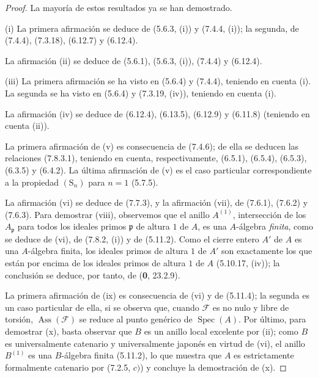 \begin{proof}
La mayoría de estos resultados ya se han demostrado.

(i) La primera afirmación se deduce de (5.6.3, (i)) y (7.4.4, (i));
la segunda, de (7.4.4), (7.3.18), (6.12.7) y (6.12.4).

La afirmación (ii) se deduce de (5.6.1), (5.6.3, (i)), (7.4.4) y (6.12.4).

(iii) La primera afirmación se ha visto en (5.6.4) y (7.4.4), teniendo en
cuenta (i). La segunda se ha visto en (5.6.4) y (7.3.19, (iv)), teniendo en
cuenta (i).

La afirmación (iv) se deduce de (6.12.4), (6.13.5), (6.12.9) y (6.11.8)
(teniendo en cuenta (ii)).

La primera afirmación de (v) es consecuencia de (7.4.6); de ella se deducen
las relaciones (7.8.3.1), teniendo en cuenta, respectivamente, (6.5.1),
(6.5.4), (6.5.3), (6.3.5) y (6.4.2). La última afirmación de (v) es el
caso particular correspondiente a la propiedad $(\mathrm S_n)$ para $n=1$
(5.7.5).

La afirmación (vi) se deduce de (7.7.3), y la afirmación (vii), de (7.6.1),
(7.6.2) y (7.6.3). Para demostrar (viii), observemos que el anillo
$A^{(1)}$, intersección de los $A_{\mathfrak p}$ para todos los ideales
primos $\mathfrak p$ de altura $1$ de $A$, es una $A$-álgebra \emph{finita}, como
se deduce de (vi), de (7.8.2, (i)) y de (5.11.2). Como el cierre entero
$A'$ de $A$ es una $A$-álgebra finita, los ideales primos de altura $1$ de
$A'$ son exactamente los que están por encima de los ideales primos de
altura $1$ de $A$ (5.10.17, (iv)); la conclusión se deduce, por tanto, de
(\textbf 0, 23.2.9).

La primera afirmación de (ix) es consecuencia de (vi) y de (5.11.4); la
segunda es un caso particular de ella, si se observa que, cuando $\mathcal F$
es no nulo y libre de torsión, $\operatorname{Ass}(\mathcal F)$ se reduce al punto
genérico de $\operatorname{Spec}(A)$. Por último, para demostrar (x), basta
observar que $B$ es un anillo local excelente por (ii); como $B$ es
universalmente catenario y universalmente japonés en virtud de (vi), el
anillo $B^{(1)}$ es una $B$-álgebra finita (5.11.2), lo que muestra que
$A$ es estrictamente formalmente catenario por (7.2.5, $c)$) y concluye la
demostración de (x).
\end{proof}
